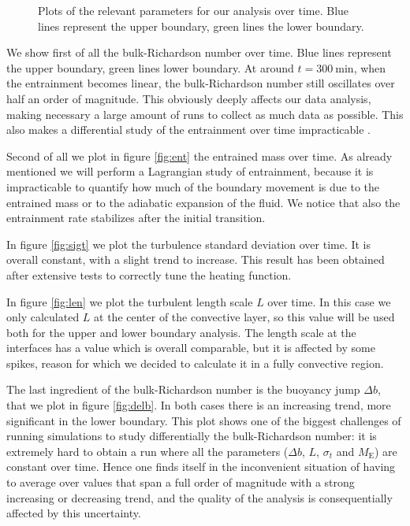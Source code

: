 \begin{figure}[t!]
      \hfill
	\caption{Plots of the relevant parameters for our analysis over time. Blue lines represent the upper boundary, green lines the lower boundary.}
	  \label{fig:2dsingle}
  \end{figure}
We show first of all the bulk-Richardson number over time. Blue lines represent the upper boundary, green lines lower boundary. At around $t=\mathrm{300 \ min}$, when the entrainment becomes linear, the bulk-Richardson number still oscillates over half an order of magnitude. This obviously deeply affects our data analysis, making necessary a large amount of runs to collect as much data as possible. This also makes a differential study of the entrainment over time impracticable . 

Second of all we plot in figure \ref{fig:ent} the entrained mass over time. As already mentioned we will perform a Lagrangian study of entrainment, because it is impracticable to quantify how much of the boundary movement is due to the entrained mass or to the adiabatic expansion of the fluid. We notice that also the entrainment rate stabilizes after the initial transition. 

  In figure \ref{fig:sigt} we plot the turbulence standard deviation over time. It is overall constant, with a slight trend to increase. This result has been obtained after extensive tests to correctly tune the heating function.

  In figure \ref{fig:len} we plot the turbulent length scale $L$ over time. In this case we only calculated $L$ at the center of the convective layer, so this value will be used both for the upper and lower boundary analysis. The length scale at the interfaces has a value which is overall comparable, but it is affected by some spikes, reason for which we decided to calculate it in a fully convective region.

  The last ingredient of the bulk-Richardson number is the buoyancy jump $\Delta b$, that we plot in figure \ref{fig:delb}. In both cases there is an increasing trend, more significant in the lower boundary. This plot shows one of the biggest challenges of running simulations to study differentially the bulk-Richardson number: it is extremely hard to obtain a run where all the parameters ($\Delta b$, $L$, $\sigma_t$ and $M_{\mathrm{E}}$) are constant over time. Hence one finds itself in the inconvenient situation of having to average over values that span a full order of magnitude with a strong increasing or decreasing trend, and the quality of the analysis is consequentially affected by this uncertainty.

